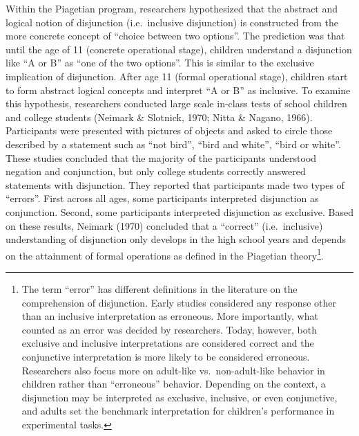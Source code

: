 \documentclass[
  english,
  ,man,floatsintext]{apa6}
\begin{document}
Within the Piagetian program, researchers hypothesized that the abstract and logical notion of disjunction (i.e.~inclusive disjunction) is constructed from the more concrete concept of \enquote{choice between two options}. The prediction was that until the age of 11 (concrete operational stage), children understand a disjunction like \enquote{A or B} as \enquote{one of the two options}. This is similar to the exclusive implication of disjunction. After age 11 (formal operational stage), children start to form abstract logical concepts and interpret \enquote{A or B} as inclusive. To examine this hypothesis, researchers conducted large scale in-class tests of school children and college students (Neimark \& Slotnick, 1970; Nitta \& Nagano, 1966). Participants were presented with pictures of objects and asked to circle those described by a statement such as \enquote{not bird}, \enquote{bird and white}, \enquote{bird or white}. These studies concluded that the majority of the participants understood negation and conjunction, but only college students correctly answered statements with disjunction. They reported that participants made two types of \enquote{errors}. First across all ages, some participants interpreted disjunction as conjunction. Second, some participants interpreted disjunction as exclusive. Based on these results, Neimark (1970) concluded that a \enquote{correct} (i.e.~inclusive) understanding of disjunction only develops in the high school years and depends on the attainment of formal operations as defined in the Piagetian theory\footnote{The term \enquote{error} has different definitions in the literature on the comprehension of disjunction. Early studies considered any response other than an inclusive interpretation as erroneous. More importantly, what counted as an error was decided by researchers. Today, however, both exclusive and inclusive interpretations are considered correct and the conjunctive interpretation is more likely to be considered erroneous. Researchers also focus more on adult-like vs.~non-adult-like behavior in children rather than \enquote{erroneous} behavior. Depending on the context, a disjunction may be interpreted as exclusive, inclusive, or even conjunctive, and adults set the benchmark interpretation for children's performance in experimental tasks.}.
\end{document}
